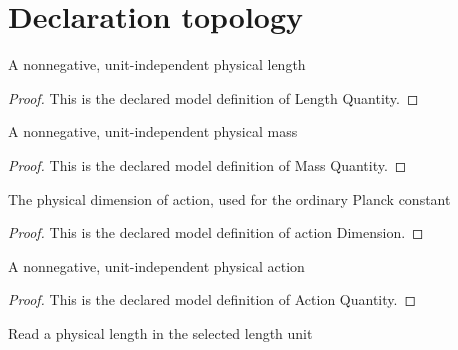 \section{Declaration topology}
\begin{definition}
  \label{def:physics:phyx-mini-0581:phyxminiproblems-problemphyxmini0581-lengthquantity}
  A nonnegative, unit-independent physical length
\end{definition}
\begin{proof}
  This is the declared model definition of Length Quantity.
\end{proof}
\begin{definition}
  \label{def:physics:phyx-mini-0581:phyxminiproblems-problemphyxmini0581-massquantity}
  A nonnegative, unit-independent physical mass
\end{definition}
\begin{proof}
  This is the declared model definition of Mass Quantity.
\end{proof}
\begin{definition}
  \label{def:physics:phyx-mini-0581:phyxminiproblems-problemphyxmini0581-actiondimension}
  The physical dimension of action, used for the ordinary Planck constant
\end{definition}
\begin{proof}
  This is the declared model definition of action Dimension.
\end{proof}
\begin{definition}
  \label{def:physics:phyx-mini-0581:phyxminiproblems-problemphyxmini0581-actionquantity}
  A nonnegative, unit-independent physical action
\end{definition}
\begin{proof}
  This is the declared model definition of Action Quantity.
\end{proof}
\begin{definition}
  \label{def:physics:phyx-mini-0581:phyxminiproblems-problemphyxmini0581-lengthreadout}
  Read a physical length in the selected length unit
\end{definition}
